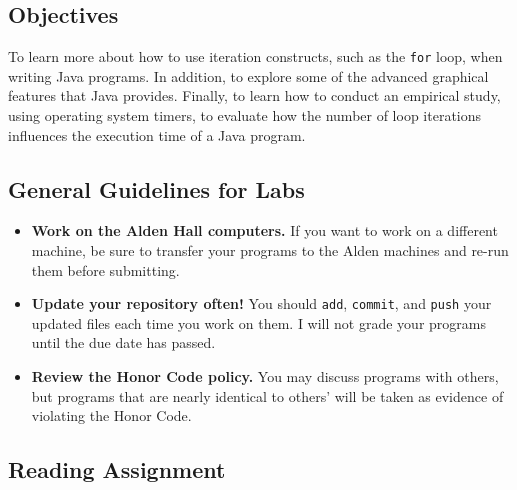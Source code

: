 



\vspace{-0.2in}
\subsection*{Objectives}
\vspace{-0.05in}

To learn more about how to use iteration constructs, such as the {\tt for} loop, when writing Java programs. In
addition, to explore some of the advanced graphical features that Java provides.  Finally, to learn how to conduct an
empirical study, using operating system timers, to evaluate how the number of loop iterations influences the execution
time of a Java program.

\vspace{-0.15in}
\subsection*{General Guidelines for Labs}
\vspace{-0.05in}

\begin{itemize}
\item
{\bf Work on the Alden Hall computers.} If you want to work on a different
machine, be sure to transfer your programs to the Alden
machines and re-run them before submitting.
\item
  {\bf Update your repository often!} You should {\tt add}, {\tt commit}, 
  and {\tt push} your updated files each time you work on them.  I will not grade 
your programs until the due date has passed.
\item
{\bf Review the Honor Code policy.} You
may discuss programs with others, but programs that are nearly identical
to others' will be taken as evidence of violating the Honor Code.
\end{itemize}

\vspace{-0.25in}
\subsection*{Reading Assignment}
\vspace{-0.05in}

